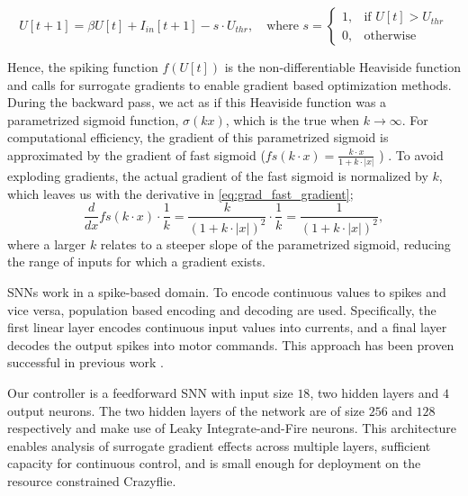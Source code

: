 \begin{equation}
U[t+1] = \beta U[t] + I_{in}[t+1] - s \cdot U_{thr}, \quad \text{where } s = \begin{cases}
1, & \text{if } U[t] > U_{thr} \\
0, & \text{otherwise}
\end{cases}
\end{equation}

Hence, the spiking function $f(U[t])$ is the non-differentiable Heaviside function and calls for surrogate gradients \cite{NeftciSurrogate} to enable gradient based optimization methods. During the backward pass, we act as if this Heaviside function was a parametrized sigmoid function, $\sigma(kx)$, which is the true when $k \rightarrow \infty$. For computational efficiency, the gradient of this parametrized sigmoid is approximated by the gradient of fast sigmoid (\(fs(k\cdot x) = \frac{k\cdot x}{1+k\cdot |x|}\) ) \cite{zenke2018superspike}. To avoid exploding gradients, the actual gradient of the fast sigmoid is normalized by $k$, which leaves us with the derivative in \autoref{eq:grad_fast_gradient}; 
\begin{equation}\label{eq:grad_fast_gradient}
\frac{d }{dx}fs(k\cdot x)\cdot \frac{1}{k} = \frac{k}{(1+k\cdot |x|)^2}\cdot \frac{1}{k} = \frac{1}{(1+k\cdot |x|)^2}, 
\end{equation}
where a larger $k$ relates to a steeper slope of the parametrized sigmoid, reducing the range of inputs for which a gradient exists. 

SNNs work in a spike-based domain. To encode continuous values to spikes and vice versa, population based encoding and decoding are used. Specifically, the first linear layer encodes continuous input values into currents, and a final layer decodes the output spikes into motor commands. This approach has been proven successful in previous work \cite{stroobants2025neuromorphic}. 

Our  controller is a feedforward SNN with input size $18$, two hidden layers and $4$ output neurons. The two hidden layers of the network are of size $256$ and $128$ respectively and make use of Leaky Integrate-and-Fire neurons. This architecture enables analysis of surrogate gradient effects across multiple layers, sufficient capacity for continuous control, and is small enough for deployment on the resource constrained Crazyflie.


